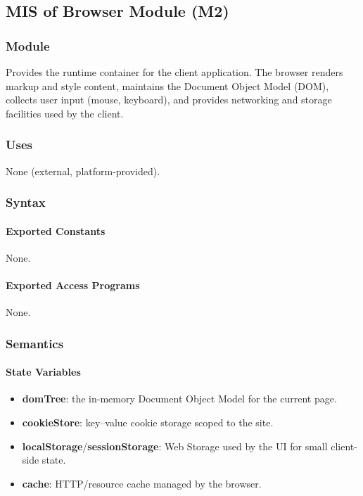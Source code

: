 \documentclass[12pt, titlepage]{article}
\begin{document}
\subsection{MIS of Browser Module (M2)}
  \label{mis:Browser}

  \subsubsection{Module}
  Provides the runtime container for the client application. The browser renders markup and
  style content, maintains the Document Object Model (DOM), collects user input (mouse,
  keyboard), and provides networking and storage facilities used by the client.


  \subsubsection{Uses}
  None (external, platform-provided).

  \subsubsection{Syntax}
  \paragraph{Exported Constants} None.  %

  \paragraph{Exported Access Programs} None. %

  \subsubsection{Semantics}

  \paragraph{State Variables}
  \begin{itemize}
    \item \textbf{domTree}: the in-memory Document Object Model for the current page.
    \item \textbf{cookieStore}: key–value cookie storage scoped to the site.
    \item \textbf{localStorage}/\textbf{sessionStorage}: Web Storage used by the UI for small client-side state.
    \item \textbf{cache}: HTTP/resource cache managed by the browser.
  \end{itemize}
\end{document}
